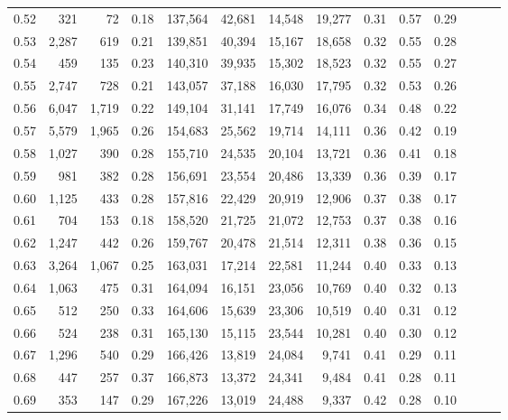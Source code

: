 \begin{tabular}{rrrrrrrrrrrrrr}
0.52 &     321 &     72 &  0.18 &  137,564 &   42,681 &  14,548 &  19,277 &  0.31 &  0.57 &      0.29 \\
0.53 &   2,287 &    619 &  0.21 &  139,851 &   40,394 &  15,167 &  18,658 &  0.32 &  0.55 &      0.28 \\
0.54 &     459 &    135 &  0.23 &  140,310 &   39,935 &  15,302 &  18,523 &  0.32 &  0.55 &      0.27 \\
0.55 &   2,747 &    728 &  0.21 &  143,057 &   37,188 &  16,030 &  17,795 &  0.32 &  0.53 &      0.26 \\
0.56 &   6,047 &  1,719 &  0.22 &  149,104 &   31,141 &  17,749 &  16,076 &  0.34 &  0.48 &      0.22 \\
0.57 &   5,579 &  1,965 &  0.26 &  154,683 &   25,562 &  19,714 &  14,111 &  0.36 &  0.42 &      0.19 \\
0.58 &   1,027 &    390 &  0.28 &  155,710 &   24,535 &  20,104 &  13,721 &  0.36 &  0.41 &      0.18 \\
0.59 &     981 &    382 &  0.28 &  156,691 &   23,554 &  20,486 &  13,339 &  0.36 &  0.39 &      0.17 \\
0.60 &   1,125 &    433 &  0.28 &  157,816 &   22,429 &  20,919 &  12,906 &  0.37 &  0.38 &      0.17 \\
0.61 &     704 &    153 &  0.18 &  158,520 &   21,725 &  21,072 &  12,753 &  0.37 &  0.38 &      0.16 \\
0.62 &   1,247 &    442 &  0.26 &  159,767 &   20,478 &  21,514 &  12,311 &  0.38 &  0.36 &      0.15 \\
0.63 &   3,264 &  1,067 &  0.25 &  163,031 &   17,214 &  22,581 &  11,244 &  0.40 &  0.33 &      0.13 \\
0.64 &   1,063 &    475 &  0.31 &  164,094 &   16,151 &  23,056 &  10,769 &  0.40 &  0.32 &      0.13 \\
0.65 &     512 &    250 &  0.33 &  164,606 &   15,639 &  23,306 &  10,519 &  0.40 &  0.31 &      0.12 \\
0.66 &     524 &    238 &  0.31 &  165,130 &   15,115 &  23,544 &  10,281 &  0.40 &  0.30 &      0.12 \\
0.67 &   1,296 &    540 &  0.29 &  166,426 &   13,819 &  24,084 &   9,741 &  0.41 &  0.29 &      0.11 \\
0.68 &     447 &    257 &  0.37 &  166,873 &   13,372 &  24,341 &   9,484 &  0.41 &  0.28 &      0.11 \\
0.69 &     353 &    147 &  0.29 &  167,226 &   13,019 &  24,488 &   9,337 &  0.42 &  0.28 &      0.10 \\

\end{tabular}
